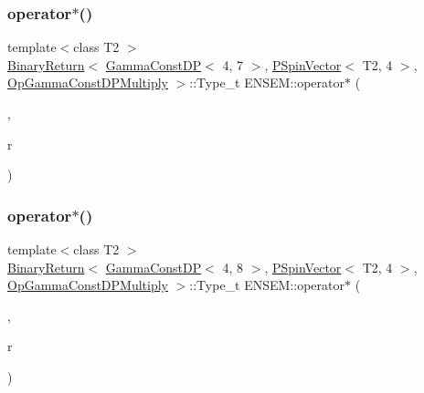 \subsubsection{\texorpdfstring{operator$\ast$()}{operator*()}\hspace{0.1cm}{\footnotesize\ttfamily [24/32]}}
{\footnotesize\ttfamily template$<$class T2 $>$ \\
\mbox{\hyperlink{structENSEM_1_1BinaryReturn}{Binary\+Return}}$<$ \mbox{\hyperlink{classENSEM_1_1GammaConstDP}{Gamma\+Const\+DP}}$<$ 4, 7 $>$, \mbox{\hyperlink{classENSEM_1_1PSpinVector}{P\+Spin\+Vector}}$<$ T2, 4 $>$, \mbox{\hyperlink{structENSEM_1_1OpGammaConstDPMultiply}{Op\+Gamma\+Const\+D\+P\+Multiply}} $>$\+::Type\+\_\+t E\+N\+S\+E\+M\+::operator$\ast$ (\begin{DoxyParamCaption}\item[{const \mbox{\hyperlink{classENSEM_1_1GammaConstDP}{Gamma\+Const\+DP}}$<$ 4, 7 $>$ \&}]{,  }\item[{const \mbox{\hyperlink{classENSEM_1_1PSpinVector}{P\+Spin\+Vector}}$<$ T2, 4 $>$ \&}]{r }\end{DoxyParamCaption})\hspace{0.3cm}{\ttfamily [inline]}}

\mbox{\label{group__primspinvector_gaf50876f75a5b7bb882a7346408b4a90c}} 
\subsubsection{\texorpdfstring{operator$\ast$()}{operator*()}\hspace{0.1cm}{\footnotesize\ttfamily [25/32]}}
{\footnotesize\ttfamily template$<$class T2 $>$ \\
\mbox{\hyperlink{structENSEM_1_1BinaryReturn}{Binary\+Return}}$<$ \mbox{\hyperlink{classENSEM_1_1GammaConstDP}{Gamma\+Const\+DP}}$<$ 4, 8 $>$, \mbox{\hyperlink{classENSEM_1_1PSpinVector}{P\+Spin\+Vector}}$<$ T2, 4 $>$, \mbox{\hyperlink{structENSEM_1_1OpGammaConstDPMultiply}{Op\+Gamma\+Const\+D\+P\+Multiply}} $>$\+::Type\+\_\+t E\+N\+S\+E\+M\+::operator$\ast$ (\begin{DoxyParamCaption}\item[{const \mbox{\hyperlink{classENSEM_1_1GammaConstDP}{Gamma\+Const\+DP}}$<$ 4, 8 $>$ \&}]{,  }\item[{const \mbox{\hyperlink{classENSEM_1_1PSpinVector}{P\+Spin\+Vector}}$<$ T2, 4 $>$ \&}]{r }\end{DoxyParamCaption})\hspace{0.3cm}{\ttfamily [inline]}}

